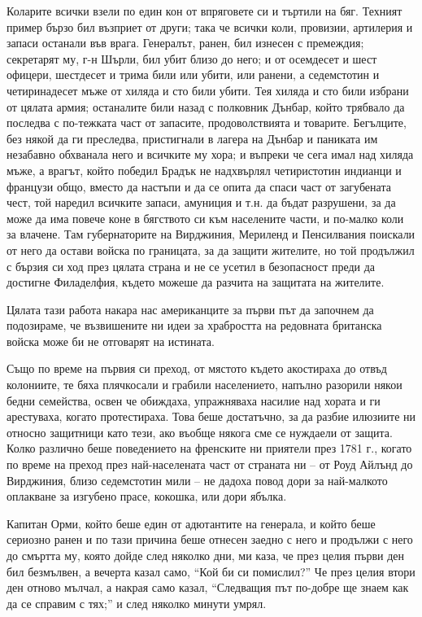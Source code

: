 \documentclass[12pt]{book}
\begin{document}
Коларите всички взели по един кон от впряговете си и търтили на бяг. Техният пример бързо бил възприет от други; така че всички коли, провизии, артилерия и запаси останали във врага. Генералът, ранен, бил изнесен с премеждия; секретарят му, г-н Шърли, бил убит близо до него; и от осемдесет и шест офицери, шестдесет и трима били или убити, или ранени, а седемстотин и четиринадесет мъже от хиляда и сто били убити. Тея хиляда и сто били избрани от цялата армия; останалите били назад с полковник Дънбар, който трябвало да последва с по-тежката част от запасите, продоволствията и товарите. Бегълците, без някой да ги преследва, пристигнали в лагера на Дънбар и паниката им незабавно обхванала него и всичките му хора; и въпреки че сега имал над хиляда мъже, а врагът, който победил Брадък не надхвърлял четиристотин индианци и французи общо, вместо да настъпи и да се опита да спаси част от загубената чест, той наредил всичките запаси, амуниция и т.н. да бъдат разрушени, за да може да има повече коне в бягството си към населените части, и по-малко коли за влачене. Там губернаторите на Вирджиния, Мериленд и Пенсилвания поискали от него да остави войска по границата, за да защити жителите, но той продължил с бързия си ход през цялата страна и не се усетил в безопасност преди да достигне Филаделфия, където можеше да разчита на защитата на жителите.

Цялата тази работа накара нас американците за първи път да започнем да подозираме, че възвишените ни идеи за храбростта на редовната британска войска може би не отговарят на истината.

Също по време на първия си преход, от мястото където акостираха до отвъд колониите, те бяха плячкосали и грабили населението, напълно разорили някои бедни семейства, освен че обиждаха, упражняваха насилие над хората и ги арестуваха, когато протестираха. Това беше достатъчно, за да разбие илюзиите ни относно защитници като тези, ако въобще някога сме се нуждаели от защита. Колко различно беше поведението на френските ни приятели през 1781 г., когато по време на преход през най-населената част от страната ни – от Роуд Айлънд до Вирджиния, близо седемстотин мили – не дадоха повод дори за най-малкото оплакване за изгубено прасе, кокошка, или дори ябълка. 

Капитан Орми, който беше един от адютантите на генерала, и който беше сериозно ранен и по тази причина беше отнесен заедно с него и продължи с него до смъртта му, която дойде след няколко дни, ми каза, че през целия първи ден бил безмълвен, а вечерта казал само, “Кой би си помислил?” Че през целия втори ден отново мълчал, а накрая само казал, “Следващия път по-добре ще знаем как да се справим с тях;” и след няколко минути умрял.
\end{document}
